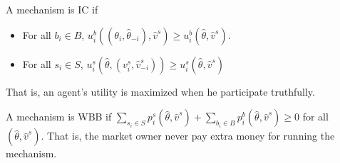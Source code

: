 \begin{definition}
	A mechanism is IC if
	\begin{itemize}
		\item For all $b_i\in B$,
			$u^b_i((\theta_i,\hat\theta_{-i}),\hat v^s)
			\geq u^b_i(\hat\theta,\hat v^s)$.
		\item For all $s_i\in S$,
			$u^s_i(\hat\theta,(v^s_i,\hat v^s_{-i}))
			\geq 
			u^s_i(\hat\theta,\hat v^s)$
	\end{itemize}
	That is, an agent's utility is maximized when he participate truthfully.
\end{definition}

\begin{definition}
	A mechanism is WBB if
	$\sum_{s_i\in S} p^s_i(\hat\theta,\hat v^s)
	+\sum_{b_i\in B} p^b_i(\hat\theta,\hat v^s) \geq 0$
	for all $(\hat\theta,\hat v^s)$.
	That is, the market owner never pay extra money for running the mechanism.
\end{definition}
